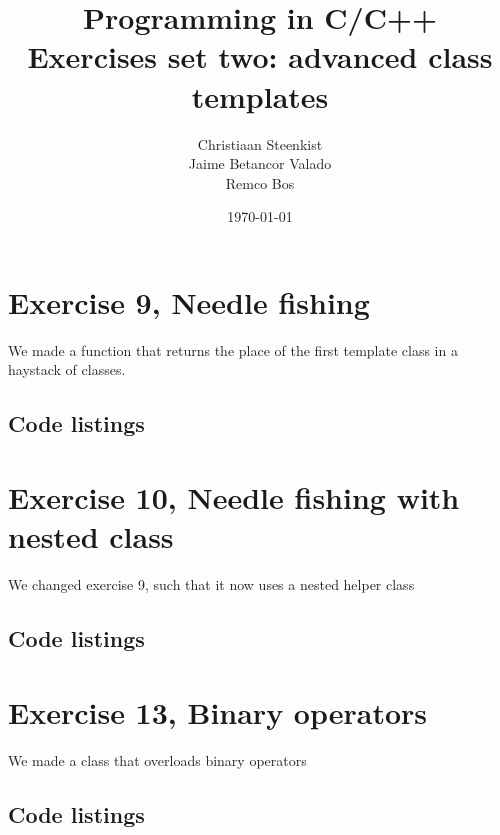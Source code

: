\documentclass[11pt]{article}
\begin{document}
\title{Programming in C/C++ \\
       Exercises set two: advanced class templates
}
\date{\today}
\author{Christiaan Steenkist \\
Jaime Betancor Valado \\
Remco Bos \\
}

\maketitle
\section*{Exercise 9, Needle fishing}
We made a function that returns the place of the first template class in a haystack of classes.

\subsection*{Code listings}



\section*{Exercise 10, Needle fishing with nested class}
We changed exercise 9, such that it now uses a nested helper class

\subsection*{Code listings}



\section*{Exercise 13, Binary operators}
We made a class that overloads binary operators

\subsection*{Code listings}










\end{document}
